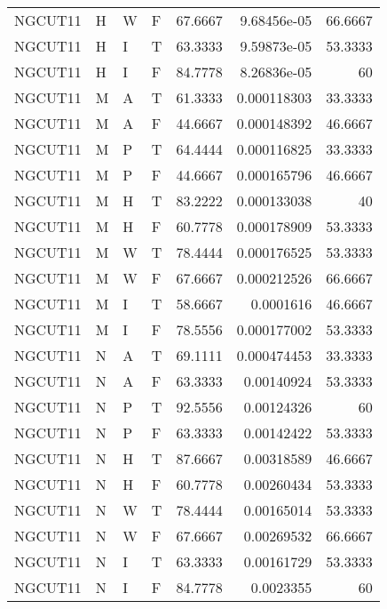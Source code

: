 \begin{table}[!htb]
{\begin{tabular}{llllrrr}
            NGCUT11  & H     & W     & F          & 67.6667    & 9.68456e-05 & 66.6667  \\
            NGCUT11  & H     & I     & T          & 63.3333    & 9.59873e-05 & 53.3333  \\
            NGCUT11  & H     & I     & F          & 84.7778    & 8.26836e-05 & 60       \\
            NGCUT11  & M     & A     & T          & 61.3333    & 0.000118303 & 33.3333  \\
            NGCUT11  & M     & A     & F          & 44.6667    & 0.000148392 & 46.6667  \\
            NGCUT11  & M     & P     & T          & 64.4444    & 0.000116825 & 33.3333  \\
            NGCUT11  & M     & P     & F          & 44.6667    & 0.000165796 & 46.6667  \\
            NGCUT11  & M     & H     & T          & 83.2222    & 0.000133038 & 40       \\
            NGCUT11  & M     & H     & F          & 60.7778    & 0.000178909 & 53.3333  \\
            NGCUT11  & M     & W     & T          & 78.4444    & 0.000176525 & 53.3333  \\
            NGCUT11  & M     & W     & F          & 67.6667    & 0.000212526 & 66.6667  \\
            NGCUT11  & M     & I     & T          & 58.6667    & 0.0001616   & 46.6667  \\
            NGCUT11  & M     & I     & F          & 78.5556    & 0.000177002 & 53.3333  \\
            NGCUT11  & N     & A     & T          & 69.1111    & 0.000474453 & 33.3333  \\
            NGCUT11  & N     & A     & F          & 63.3333    & 0.00140924  & 53.3333  \\
            NGCUT11  & N     & P     & T          & 92.5556    & 0.00124326  & 60       \\
            NGCUT11  & N     & P     & F          & 63.3333    & 0.00142422  & 53.3333  \\
            NGCUT11  & N     & H     & T          & 87.6667    & 0.00318589  & 46.6667  \\
            NGCUT11  & N     & H     & F          & 60.7778    & 0.00260434  & 53.3333  \\
            NGCUT11  & N     & W     & T          & 78.4444    & 0.00165014  & 53.3333  \\
            NGCUT11  & N     & W     & F          & 67.6667    & 0.00269532  & 66.6667  \\
            NGCUT11  & N     & I     & T          & 63.3333    & 0.00161729  & 53.3333  \\
            NGCUT11  & N     & I     & F          & 84.7778    & 0.0023355   & 60       \\
            \hline
        \end{tabular}
    }{}
\end{table}